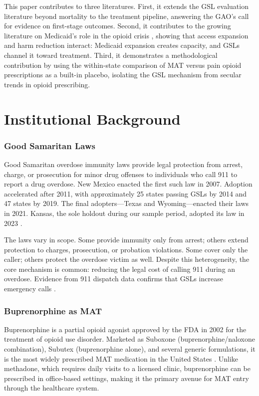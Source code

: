 \documentclass[12pt]{article}
\begin{document}
This paper contributes to three literatures. First, it extends the GSL evaluation literature \citep{rees2019, mcclellan2018, hamilton2022, ober2018} beyond mortality to the treatment pipeline, answering the GAO's call for evidence on first-stage outcomes. Second, it contributes to the growing literature on Medicaid's role in the opioid crisis \citep{maclean2020, wen2017, sharp2018}, showing that access expansion and harm reduction interact: Medicaid expansion creates capacity, and GSLs channel it toward treatment. Third, it demonstrates a methodological contribution by using the within-state comparison of MAT versus pain opioid prescriptions as a built-in placebo, isolating the GSL mechanism from secular trends in opioid prescribing.

\section{Institutional Background}

\subsubsection*{Good Samaritan Laws} Good Samaritan overdose immunity laws provide legal protection from arrest, charge, or prosecution for minor drug offenses to individuals who call 911 to report a drug overdose. New Mexico enacted the first such law in 2007. Adoption accelerated after 2011, with approximately 25 states passing GSLs by 2014 and 47 states by 2019. The final adopters---Texas and Wyoming---enacted their laws in 2021. Kansas, the sole holdout during our sample period, adopted its law in 2023 \citep{pdaps2023}.

The laws vary in scope. Some provide immunity only from arrest; others extend protection to charges, prosecution, or probation violations. Some cover only the caller; others protect the overdose victim as well. Despite this heterogeneity, the core mechanism is common: reducing the legal cost of calling 911 during an overdose. Evidence from 911 dispatch data confirms that GSLs increase emergency calls \citep{hamilton2022}.

\subsubsection*{Buprenorphine as MAT} Buprenorphine is a partial opioid agonist approved by the FDA in 2002 for the treatment of opioid use disorder. Marketed as Suboxone (buprenorphine/naloxone combination), Subutex (buprenorphine alone), and several generic formulations, it is the most widely prescribed MAT medication in the United States \citep{substance2022}. Unlike methadone, which requires daily visits to a licensed clinic, buprenorphine can be prescribed in office-based settings, making it the primary avenue for MAT entry through the healthcare system.
\end{document}
